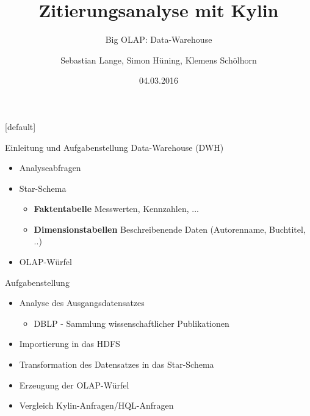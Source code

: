 \documentclass[12pt, utf8, ngerman, notes]{beamer}
\title{Zitierungsanalyse mit Kylin}
\subtitle{Big OLAP: Data-Warehouse}
\author{Sebastian Lange, Simon Hüning, Klemens Schölhorn}
\date{04.03.2016}
\begin{document}
{
    [default]
    \begin{frame}
        \titlepage
    \end{frame}
}

\begin{frame}{Einleitung und Aufgabenstellung}
  Data-Warehouse (DWH)
  \begin{itemize}
    \item Analyseabfragen
    \item Star-Schema
    \begin{itemize}
      \item \textbf{Faktentabelle} Messwerten, Kennzahlen, ...
      \item \textbf{Dimensionstabellen} Beschreibenende Daten (Autorenname, Buchtitel, ..)
    \end{itemize}
    \item OLAP-Würfel
  \end{itemize}
  Aufgabenstellung
  \begin{itemize}
    \item Analyse des Ausgangsdatensatzes
    \begin{itemize}
      \item DBLP - Sammlung wissenschaftlicher Publikationen
    \end{itemize}
    \item Importierung in das HDFS
    \item Transformation des Datensatzes in das Star-Schema
    \item Erzeugung der OLAP-Würfel
    \item Vergleich Kylin-Anfragen/HQL-Anfragen
  \end{itemize}
 \end{frame}
\end{document}
